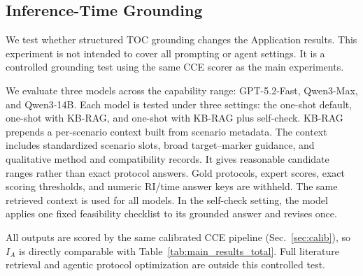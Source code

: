 \documentclass[conference]{IEEEtran}
\begin{document}
\subsection{Inference-Time Grounding}\label{sec:baselines}

We test whether structured TOC grounding changes the Application results. This
experiment is not intended to cover all prompting or agent settings. It is a
controlled grounding test using the same CCE scorer as the main experiments.

We evaluate three models across the capability range: GPT-5.2-Fast, Qwen3-Max,
and Qwen3-14B. Each model is tested under three settings: the one-shot default,
one-shot with KB-RAG, and one-shot with KB-RAG plus self-check. KB-RAG prepends
a per-scenario context built from scenario metadata. The context includes
standardized scenario slots, broad target--marker guidance, and qualitative
method and compatibility records. It gives reasonable candidate ranges rather
than exact protocol answers. Gold protocols, expert scores, exact scoring
thresholds, and numeric RI/time answer keys are withheld. The same retrieved
context is used for all models. In the self-check setting, the model applies one
fixed feasibility checklist to its grounded answer and revises once.

All outputs are scored by the same calibrated CCE pipeline
(Sec.~\ref{sec:calib}), so $I_A$ is directly comparable with
Table~\ref{tab:main_results_total}. Full literature retrieval and agentic
protocol optimization are outside this controlled test.
\end{document}
